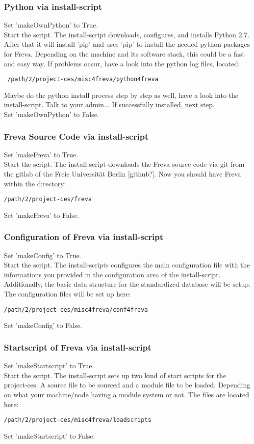 \documentclass[a4paper,11pt]{ltxdoc}
\begin{document}
\subsubsection{Python via install-script}
Set 'makeOwnPython' to True. \\
Start the script. The install-script downloads, configures, and installs Python 2.7. After that it will install 'pip' and uses 'pip' to install the needed python packages for Freva. Depending on the machine and its software stack, this could be a fast and easy way. If problems occur, have a look into the python log files, located:
\begin{verbatim}
 /path/2/project-ces/misc4freva/python4freva
\end{verbatim}
Maybe do the python install process step by step as well, have a look into the install-script. Talk to your admin... If successfully installed, next step. \\
Set 'makeOwnPython' to False.
\subsubsection{Freva Source Code via install-script}
Set 'makeFreva' to True. \\
Start the script. The install-script downloads the Freva source code via git from the gitlab of the Freie Universität Berlin [github?]. Now you should have Freva within the directory:
\begin{verbatim} 
/path/2/project-ces/freva
\end{verbatim}
Set 'makeFreva' to False.
\subsubsection{Configuration of Freva via install-script}
Set 'makeConfig' to True. \\
Start the script. The install-scripts configures the main configuration file with the informations you provided in the configuration area of the install-script. Additionally, the basic data structure for the standardized database will be setup. The configuration files will be set up here:
\begin{verbatim}/path/2/project-ces/misc4freva/conf4freva \end{verbatim}
Set 'makeConfig' to False.
\subsubsection{Startscript of Freva via install-script}
Set 'makeStartscript' to True. \\
Start the script. The install-script sets up two kind of start scripts for the project-ces. A source file to be sourced and a module file to be loaded. Depending on what your machine/node having a module system or not. The files are located here:
\begin{verbatim}/path/2/project-ces/misc4freva/loadscripts \end{verbatim}
Set 'makeStartscript' to False.
\end{document}
